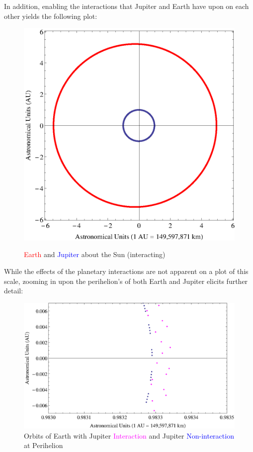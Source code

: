 \documentclass{report}
\begin{document}
\begin{enumerate}
\begin{figure}[H]
\label{sejCircle}
\end{figure}
In addition, enabling the interactions that Jupiter and Earth have upon on each other yields the following plot:
\begin{figure}[H]
\centering \caption{\textcolor{red}{Earth} and \textcolor{blue}{Jupiter} about the Sun (interacting)}
\includegraphics[scale=.63]{sejCircle.eps}
\label{sej}
\end{figure}
While the effects of the planetary interactions are not apparent on a plot of this scale, zooming in upon the perihelion's of both Earth and Jupiter elicits further detail:
\begin{figure}[H]
\centering \caption{Orbits of Earth with Jupiter \textcolor{magenta}{Interaction} and Jupiter \textcolor{blue}{Non-interaction} at Perihelion}
\includegraphics[scale=.9]{interactEarth.eps}

\end{figure}
\end{enumerate}
\end{document}
